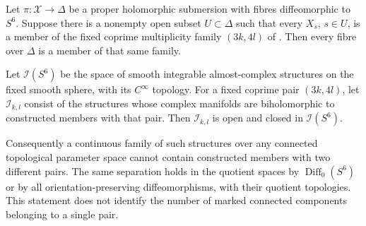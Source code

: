 \begin{proposition}\hypertarget{tag-0338}{}\label{push:src:E.2.22}


Let $\pi:\mathcal X\to\Delta$ be a proper holomorphic
submersion with fibres diffeomorphic to $S^6$.  Suppose
there is a nonempty open subset $U\subset\Delta$ such
that every $X_s$, $s\in U$, is a member of the fixed
coprime multiplicity family $(3k,4l)$ of .
Then every fibre over $\Delta$ is a member of that
same family.
\end{proposition}

\begin{corollary}\hypertarget{tag-033A}{}\label{push:src:E.2.24}


Let $\mathcal I(S^6)$ be the space of smooth integrable
almost-complex structures on the fixed smooth sphere,
with its $C^\infty$ topology.  For a fixed coprime pair
$(3k,4l)$, let $\mathcal I_{k,l}$ consist of the structures
whose complex manifolds are biholomorphic to constructed
members with that pair.  Then $\mathcal I_{k,l}$ is open
and closed in $\mathcal I(S^6)$.

Consequently a continuous family of such structures
over any connected topological parameter space cannot
contain constructed members with two different pairs.
The same separation holds in the quotient spaces by
$\operatorname{Diff}_0(S^6)$ or by all orientation-preserving
diffeomorphisms, with their quotient topologies.
This statement does not identify the number of marked
connected components belonging to a single pair.
\end{corollary}

